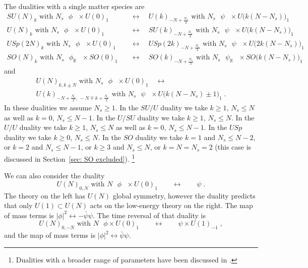 \documentclass[a4paper, 12pt]{article}
\numberwithin{equation}{section}
\newcommand{\be}{\begin{equation}} \newcommand{\ee}{\end{equation}}
\newcommand{\bea}{\begin{equation} \begin{aligned}} \newcommand{\eea}{\end{aligned} \end{equation}}
\newcommand{\bR}{\mathbb{R}}
\begin{document}
The dualities with a single matter species are \cite{Aharony:2015mjs, Hsin:2016blu, Aharony:2016jvv}
\bea
\label{dualities one spieces}
SU(N)_k \text{ with $N_s$ $\phi$ } \times U(0)_1 \quad&\longleftrightarrow\quad U(k)_{-N + \frac{N_s}2} \text{ with $N_s$ $\psi$ } \times U\big( k(N-N_s) \big)_1 \\
U(N)_k \text{ with $N_s$ $\phi$ } \times U(0)_1 \quad&\longleftrightarrow\quad SU(k)_{-N + \frac{N_s}2} \text{ with $N_s$ $\psi$ } \times U\big( k(N-N_s) \big)_1 \\
USp(2N)_k \text{ with $N_s$ $\phi$ } \times U(0)_1 \quad&\longleftrightarrow\quad USp(2k)_{-N + \frac{N_s}2} \text{ with $N_s$ $\psi$ } \times U\big( 2k(N-N_s) \big)_1 \\
SO(N)_k \text{ with $N_s$ $\phi_\bR$ } \times SO(0)_1 \quad&\longleftrightarrow\quad SO(k)_{-N + \frac{N_s}2} \text{ with $N_s$ $\psi_\bR$ } \times SO\big( k(N-N_s) \big)_1
\eea
and
\begin{multline}
\label{dualities one spieces U/U}
U(N)_{k,k\pm N} \text{ with $N_s$ $\phi$ } \times U(0)_1 \quad\longleftrightarrow\quad \\
U(k)_{-N + \frac{N_s}2,\, -N \mp k + \frac{N_s}2} \text{ with $N_s$ $\psi$ } \times U\big( k(N-N_s) \pm 1 \big)_1 \;.
\end{multline}
In these dualities we assume $N_s \geq 1$. In the $SU/U$ duality we take $k\geq1$, $N_s \leq N$ as well as $k=0$, $N_s \leq N-1$. In the $U/SU$ duality we take $k\geq1$, $N_s \leq N$. In the $U/U$ duality we take $k\geq1$, $N_s \leq N$ as well as $k=0$, $N_s \leq N-1$. In the $USp$ duality we take $k\geq 0$, $N_s \leq N$. In the $SO$ duality we take $k=1$ and $N_s \leq N-2$, or $k=2$ and $N_s \leq N-1$, or $k\geq 3$ and $N_s \leq N$, or $k=N = N_s=2$ (this case is discussed in Section~\ref{sec: SO excluded}).%
\footnote{Dualities with a broader range of parameters have been discussed in \cite{Komargodski:2017keh}.}

We can also consider the duality
\be
U(N)_{0,N} \text{ with $N$ $\phi$ } \times U(0)_1 \qquad\longleftrightarrow\qquad \psi \;.
\ee
The theory on the left has $U(N)$ global symmetry, however the duality predicts that only $U(1) \subset U(N)$ acts on the low-energy theory on the right. The map of mass terms is $|\phi|^2 \leftrightarrow - \bar\psi\psi$. The time reversal of that duality is
\be
U(N)_{0,-N} \text{ with $N$ $\phi$} \times U(0)_1 \qquad\longleftrightarrow\qquad \psi \times U(1)_{-1} \;,
\ee
and the map of mass terms is $|\phi|^2 \leftrightarrow \bar\psi\psi$.
\end{document}
